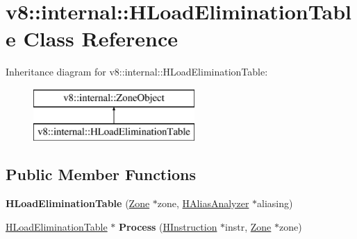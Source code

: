 \hypertarget{classv8_1_1internal_1_1_h_load_elimination_table}{}\section{v8\+:\+:internal\+:\+:H\+Load\+Elimination\+Table Class Reference}
\label{classv8_1_1internal_1_1_h_load_elimination_table}
Inheritance diagram for v8\+:\+:internal\+:\+:H\+Load\+Elimination\+Table\+:\begin{figure}[H]
\begin{center}
\leavevmode
\includegraphics[height=2.000000cm]{classv8_1_1internal_1_1_h_load_elimination_table}
\end{center}
\end{figure}
\subsection*{Public Member Functions}
\begin{DoxyCompactItemize}
\item 
{\bfseries H\+Load\+Elimination\+Table} (\hyperlink{classv8_1_1internal_1_1_zone}{Zone} $\ast$zone, \hyperlink{classv8_1_1internal_1_1_h_alias_analyzer}{H\+Alias\+Analyzer} $\ast$aliasing)\hypertarget{classv8_1_1internal_1_1_h_load_elimination_table_aa6c01ae747f01639ac6f860d651bda28}{}\label{classv8_1_1internal_1_1_h_load_elimination_table_aa6c01ae747f01639ac6f860d651bda28}

\item 
\hyperlink{classv8_1_1internal_1_1_h_load_elimination_table}{H\+Load\+Elimination\+Table} $\ast$ {\bfseries Process} (\hyperlink{classv8_1_1internal_1_1_h_instruction}{H\+Instruction} $\ast$instr, \hyperlink{classv8_1_1internal_1_1_zone}{Zone} $\ast$zone)\hypertarget{classv8_1_1internal_1_1_h_load_elimination_table_ac18e4f7b207db6804915ecca4957eb4a}{}\label{classv8_1_1internal_1_1_h_load_elimination_table_ac18e4f7b207db6804915ecca4957eb4a}

\end{DoxyCompactItemize}
